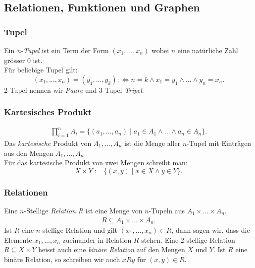 \subsection{Relationen, Funktionen und Graphen}%
\label{sub:Relatiinen, Funktionen und Graphen}

\subsubsection{Tupel}%
\label{ssub:tupel}
Ein \textit{n-Tupel} ist ein Term der Form $(x_1,...,x_n)$ wobei $n$ eine natürliche Zahl grösser $0$ ist. \\
Für beliebige Tupel gilt:
\begin{equation}
	(x_1,\dots,x_n)=(y_1,\dots,y_k):\Leftrightarrow n=k\land x_1=y_1\land\dots\land y_n=x_n.
\end{equation}
2-Tupel nennen wir \textit{Paare} und 3-Tupel \textit{Tripel}.

\subsubsection{Kartesisches Produkt}%
\label{ssub:kartesisches_produkt}
\begin{minipage}{0.9\linewidth}
\begin{align*}
\prod_{i=1}^{n}A_i=\big\{(a_1,\dots,a_n)\mid a_1\in A_1\land\dots\land a_n\in A_n \big\}.
\end{align*}
Das \textit{kartesische} Produkt von $A_1, ..., A_n$ ist die Menge aller $n$-Tupel mit Einträgen aus den Mengen $A_1,
..., A_n$ 
\\
Für das kartesische Produkt von zwei Mengen schreibt man:
\[
X\times Y:=\{(x,y)\mid x\in X\land y\in Y \}.
\]
\end{minipage}

\subsubsection{Relationen}%
\label{ssub:relationen}
\begin{minipage}{0.9\linewidth}
Eine $n$-Stellige \textit{Relation R} ist eine Menge von $n$-Tupeln aus $A_1 \times \dots \times A_n$.
\begin{align*}
R\subseteq A_1\times\dots \times A_n.
\end{align*}
Ist $R$ eine $n$-stellige Relation und gilt $(x_1,\dots,x_n)\in R$, dann sagen wir, dass die Elemente $x_1,\dots,x_n$ zueinander in Relation $R$ stehen.
Eine $2$-stellige Relation $R\subseteq X\times Y$ heisst auch eine \textit{binäre Relation} auf den Mengen $X$ und $Y$. Ist $R$ eine binäre Relation, so schreiben wir auch $xRy$ für $(x,y)\in R$.
\end{minipage}

